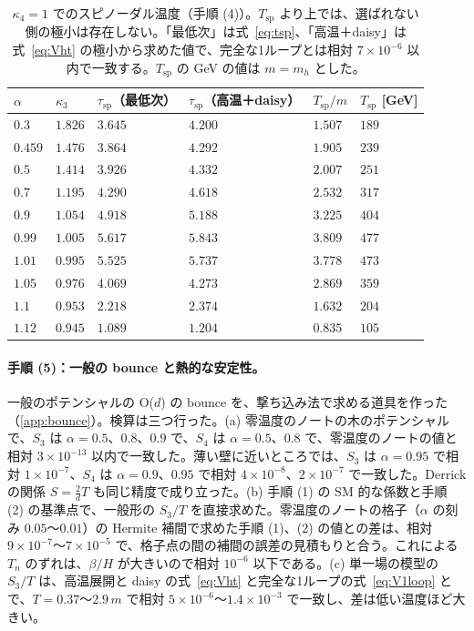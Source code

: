 \documentclass[a4paper,10pt]{ltjsarticle}
\begin{document}
\begin{table}[tbp]
\centering\small
\caption{$\kappa_4=1$ でのスピノーダル温度（手順 (4)）。$T_{\mathrm{sp}}$ より上では、選ばれない側の極小は存在しない。「最低次」は式~\eqref{eq:tsp}、「高温＋daisy」は式~\eqref{eq:Vht} の極小から求めた値で、完全な1ループとは相対 $7\times10^{-6}$ 以内で一致する。$T_{\mathrm{sp}}$ の GeV の値は $m=m_h$ とした。}
\label{tab:single}
\begin{tabular}{llllll}
\toprule
$\alpha$ & $\kappa_3$ & $\tau_{\mathrm{sp}}$（最低次） & $\tau_{\mathrm{sp}}$（高温＋daisy） & $T_{\mathrm{sp}}/m$ & $T_{\mathrm{sp}}$ [GeV] \\
\midrule
$0.3$ & $1.826$ & $3.645$ & $4.200$ & $1.507$ & $189$ \\
$0.459$ & $1.476$ & $3.864$ & $4.292$ & $1.905$ & $239$ \\
$0.5$ & $1.414$ & $3.926$ & $4.332$ & $2.007$ & $251$ \\
$0.7$ & $1.195$ & $4.290$ & $4.618$ & $2.532$ & $317$ \\
$0.9$ & $1.054$ & $4.918$ & $5.188$ & $3.225$ & $404$ \\
$0.99$ & $1.005$ & $5.617$ & $5.843$ & $3.809$ & $477$ \\
$1.01$ & $0.995$ & $5.525$ & $5.737$ & $3.778$ & $473$ \\
$1.05$ & $0.976$ & $4.069$ & $4.273$ & $2.869$ & $359$ \\
$1.1$ & $0.953$ & $2.218$ & $2.374$ & $1.632$ & $204$ \\
$1.12$ & $0.945$ & $1.089$ & $1.204$ & $0.835$ & $105$ \\
\bottomrule
\end{tabular}
\end{table}

\paragraph{手順 (5)：一般の bounce と熱的な安定性。}一般のポテンシャルの O($d$) の bounce を、撃ち込み法で求める道具を作った（\ref{app:bounce}）。検算は三つ行った。(a) 零温度のノートの木のポテンシャルで、$S_3$ は $\alpha=0.5$、$0.8$、$0.9$ で、$S_4$ は $\alpha=0.5$、$0.8$ で、零温度のノートの値と相対 $3\times10^{-13}$ 以内で一致した。薄い壁に近いところでは、$S_3$ は $\alpha=0.95$ で相対 $1\times10^{-7}$、$S_4$ は $\alpha=0.9$、$0.95$ で相対 $4\times10^{-8}$、$2\times10^{-7}$ で一致した。Derrick の関係 $S=\frac2dT$ も同じ精度で成り立った。(b) 手順 (1) の SM 的な係数と手順 (2) の基準点で、一般形の $S_3/T$ を直接求めた。零温度のノートの格子（$\alpha$ の刻み $0.05$〜$0.01$）の Hermite 補間で求めた手順 (1)、(2) の値との差は、相対 $9\times10^{-7}$〜$7\times10^{-5}$ で、格子点の間の補間の誤差の見積もりと合う。これによる $T_n$ のずれは、$\beta/H$ が大きいので相対 $10^{-6}$ 以下である。(c) 単一場の模型の $S_3/T$ は、高温展開と daisy の式~\eqref{eq:Vht} と完全な1ループの式~\eqref{eq:V1loop} とで、$T=0.37$〜$2.9\,m$ で相対 $5\times10^{-6}$〜$1.4\times10^{-3}$ で一致し、差は低い温度ほど大きい。
\end{document}
